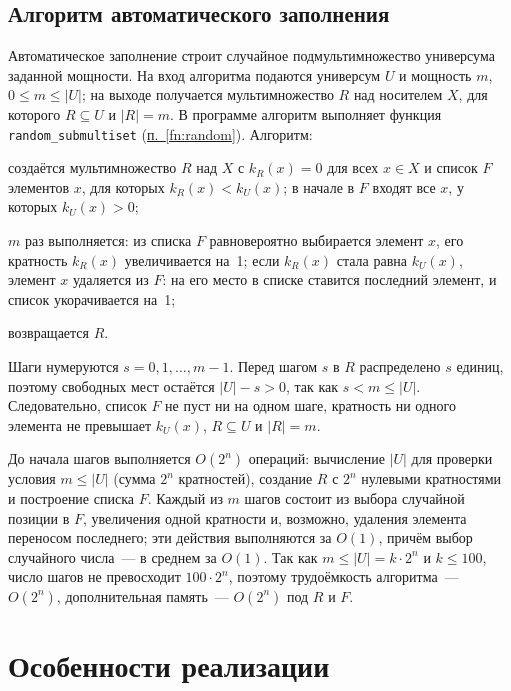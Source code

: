 \documentclass[14pt,a4paper]{extarticle}
\newcommand{\lnk}[2]{\hyperref[#1]{#2~\ref*{#1}}}
\newcommand{\code}[1]{\texttt{#1}}
\newcommand{\us}{\_\allowbreak{}}
\newcommand{\kU}{k_U(x)}
\begin{document}
\subsection{Алгоритм автоматического заполнения}\label{sec:fill}

Автоматическое заполнение строит случайное подмультимножество универсума заданной мощности. На вход алгоритма подаются универсум $U$ и мощность $m$, $0 \leqslant m \leqslant |U|$; на выходе получается мультимножество $R$ над носителем $X$, для которого $R \subseteq U$ и $|R| = m$. В программе алгоритм выполняет функция \code{random\us{}submultiset} (\lnk{fn:random}{п.}). Алгоритм:
\begin{steps}
\item создаётся мультимножество $R$ над $X$ с $k_R(x) = 0$ для всех $x \in X$ и список $F$ элементов $x$, для которых $k_R(x) < \kU$; в начале в $F$ входят все $x$, у которых $\kU > 0$;
\item $m$ раз выполняется: из списка $F$ равновероятно выбирается элемент $x$, его кратность $k_R(x)$ увеличивается на~1; если $k_R(x)$ стала равна $\kU$, элемент $x$ удаляется из $F$: на его место в списке ставится последний элемент, и список укорачивается на~1;
\item возвращается $R$.
\end{steps}

Шаги нумеруются $s = 0, 1, \ldots, m - 1$. Перед шагом $s$ в $R$ распределено $s$ единиц, поэтому свободных мест остаётся $|U| - s > 0$, так как $s < m \leqslant |U|$. Следовательно, список $F$ не пуст ни на одном шаге, кратность ни одного элемента не превышает $\kU$, $R \subseteq U$ и $|R| = m$.

До начала шагов выполняется $O(2^n)$ операций: вычисление $|U|$ для проверки условия $m \leqslant |U|$ (сумма $2^n$ кратностей), создание $R$ с $2^n$ нулевыми кратностями и построение списка $F$. Каждый из $m$ шагов состоит из выбора случайной позиции в $F$, увеличения одной кратности и, возможно, удаления элемента переносом последнего; эти действия выполняются за $O(1)$, причём выбор случайного числа~--- в среднем за $O(1)$. Так как $m \leqslant |U| = k \cdot 2^n$ и $k \leqslant 100$, число шагов не превосходит $100 \cdot 2^n$, поэтому трудоёмкость алгоритма~--- $O(2^n)$, дополнительная память~--- $O(2^n)$ под $R$ и $F$.

\section{Особенности реализации}
\end{document}

